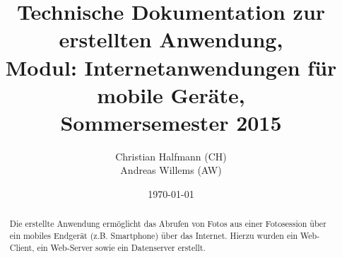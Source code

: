 \documentclass[a4paper]{scrartcl}
\title{Technische Dokumentation zur erstellten Anwendung,\\
	Modul: Internetanwendungen für mobile Geräte,\\Sommersemester 2015}
\author{Christian Halfmann (CH)\\Andreas Willems (AW)}
\date{\today}
\begin{document}
\maketitle

\begin{abstract}
Die erstellte Anwendung ermöglicht das Abrufen von Fotos aus einer Fotosession über ein mobiles Endgerät (z.B. Smartphone) über das Internet. Hierzu wurden ein Web-Client, ein Web-Server sowie ein Datenserver erstellt.
\end{abstract}
\tableofcontents
\newpage





\end{document}
